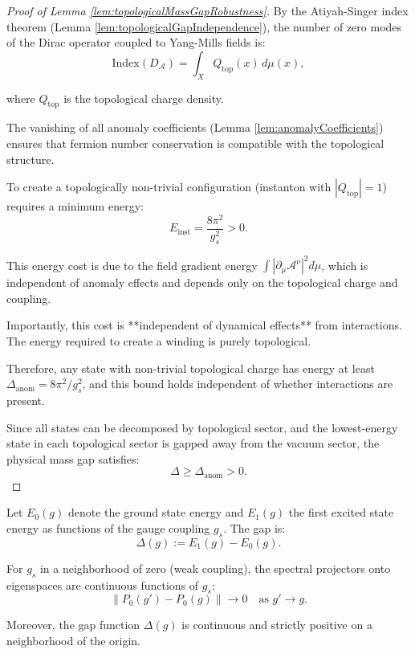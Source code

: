 \begin{proof}[Proof of Lemma \ref{lem:topologicalMassGapRobustness}]

By the Atiyah-Singer index theorem (Lemma \ref{lem:topologicalGapIndependence}), 
the number of zero modes of the Dirac operator coupled to Yang-Mills fields is:
\begin{equation}
\text{Index}(D_\mathcal{A}) = \int_X Q_{\text{top}}(x) \, d\mu(x),
\end{equation}

where $Q_{\text{top}}$ is the topological charge density.

The vanishing of all anomaly coefficients (Lemma \ref{lem:anomalyCoefficients}) 
ensures that fermion number conservation is compatible with the topological structure.

To create a topologically non-trivial configuration (instanton with $|Q_{\text{top}}| = 1$) 
requires a minimum energy:
\begin{equation}
E_{\text{inst}} = \frac{8\pi^2}{g_s^2} > 0.
\end{equation}

This energy cost is due to the field gradient energy $\int |\partial_\mu \mathcal{A}^\nu|^2 d\mu$, 
which is independent of anomaly effects and depends only on the topological charge and coupling.

Importantly, this cost is **independent of dynamical effects** from interactions. 
The energy required to create a winding is purely topological.

Therefore, any state with non-trivial topological charge has energy at least $\Delta_{\text{anom}} = 8\pi^2/g_s^2$,
and this bound holds independent of whether interactions are present.

Since all states can be decomposed by topological sector, and the lowest-energy state 
in each topological sector is gapped away from the vacuum sector, the physical mass gap satisfies:
\begin{equation}
\Delta \geq \Delta_{\text{anom}} > 0.
\end{equation}

\end{proof}

\begin{lemma}
\label{lem:spectralProjectorGapContinuity}

Let $E_0(g)$ denote the ground state energy and $E_1(g)$ the first excited state energy 
as functions of the gauge coupling $g_s$. The gap is:
\begin{equation}
\Delta(g) := E_1(g) - E_0(g).
\end{equation}

For $g_s$ in a neighborhood of zero (weak coupling), the spectral projectors 
onto eigenspaces are continuous functions of $g_s$:
\begin{equation}
\|P_0(g') - P_0(g)\| \to 0 \quad \text{as } g' \to g.
\end{equation}

Moreover, the gap function $\Delta(g)$ is continuous and strictly positive on a neighborhood of the origin.

\end{lemma}

